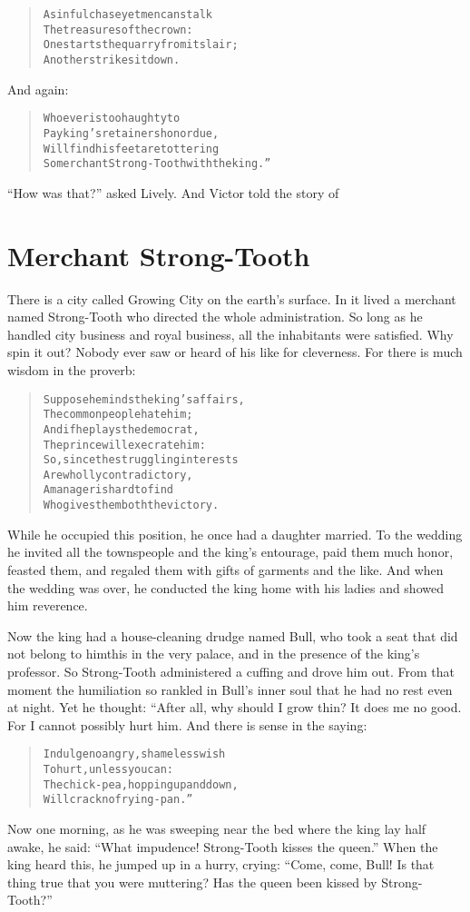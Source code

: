 \documentclass[article, twoside, 14pt]{memoir}
\renewenvironment{verbatim}{%
\begin{quote}%
\vskip -10pt%
\begin{alltt}\normalfont\large}{\end{alltt}%
\end{quote}%
\vskip -10pt
} %
\begin{document}
\begin{verbatim}
A sinful chase{\textemdash}yet men can stalk
    The treasures of the crown:
One starts the quarry from its lair;
    Another strikes it down.
\end{verbatim}
And again:

\begin{verbatim}
Whoever is too haughty to
Pay king's retainers honor due,
Will find his feet are tottering{\textemdash}
So merchant Strong-Tooth with the king.”
\end{verbatim}
``How was that?'' asked Lively. And Victor told the story of

\chapter{Merchant Strong-Tooth}

\label{s4}

There is a city called Growing City on the earth's surface.
In it lived a merchant named Strong-Tooth who directed the whole
administration. So long as he handled city business and royal
business, all the inhabitants were satisfied. Why spin it out?
Nobody ever saw or heard of his like for cleverness. For there is
much wisdom in the proverb:

\begin{verbatim}
Suppose he minds the king's affairs,
    The common people hate him;
And if he plays the democrat,
    The prince will execrate him:
So, since the struggling interests
    Are wholly contradictory,
A manager is hard to find
    Who gives them both the victory.
\end{verbatim}
While he occupied this position, he once had a daughter married. To
the wedding he invited all the townspeople and the king's
entourage, paid them much honor, feasted them, and regaled them
with gifts of garments and the like. And when the wedding was over,
he conducted the king home with his ladies and showed him
reverence.

Now the king had a house-cleaning drudge named Bull, who took a
seat that did not belong to him{\textemdash}this in the very palace, and in
the presence of the king's professor. So Strong-Tooth administered
a cuffing and drove him out. From that moment the humiliation so
rankled in Bull's inner soul that he had no rest even at night. Yet
he thought: “After all, why should I grow thin? It does me no good.
For I cannot possibly hurt him. And there is sense in the saying:

\begin{verbatim}
Indulge no angry, shameless wish
    To hurt, unless you can:
The chick-pea, hopping up and down,
    Will crack no frying-pan.”
\end{verbatim}
Now one morning, as he was sweeping near the bed where the
king lay half awake, he said:
``What impudence! Strong-Tooth kisses the queen.'' When the king
heard this, he jumped up in a hurry, crying:
``Come, come, Bull! Is that thing true that you were muttering? Has the queen been kissed by Strong-Tooth?''
\end{document}

